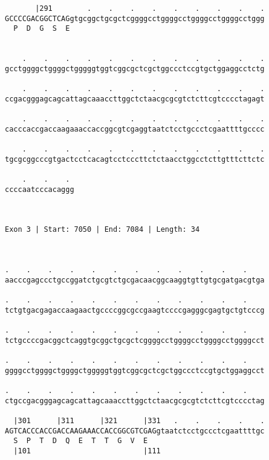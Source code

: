 \documentclass{article}
\begin{document}
\begin{Verbatim}
       |291        .    .    .    .    .    .    .    .    .
GCCCCGACGGCTCAGgtgcggctgcgctcggggcctggggcctggggcctggggcctggg
  P  D  G  S  E                                             
                                                            
  
    .    .    .    .    .    .    .    .    .    .    .    .
gcctggggctggggctgggggtggtcggcgctcgctggccctccgtgctggaggcctctg
                                                            
    .    .    .    .    .    .    .    .    .    .    .    .
ccgacgggagcagcattagcaaaccttggctctaacgcgcgtctcttcgtcccctagagt
                                                            
    .    .    .    .    .    .    .    .    .    .    .    .
cacccaccgaccaagaaaccaccggcgtcgaggtaatctcctgccctcgaattttgcccc
                                                            
    .    .    .    .    .    .    .    .    .    .    .    .
tgcgcggcccgtgactcctcacagtcctcccttctctaacctggcctcttgtttcttctc
                                                            
    .    .    . 
ccccaatcccacaggg
                
                
 
Exon 3 | Start: 7050 | End: 7084 | Length: 34



.    .    .    .    .    .    .    .    .    .    .    .    
aacccgagccctgccggatctgcgtctgcgacaacggcaaggtgttgtgcgatgacgtga
                                                            
.    .    .    .    .    .    .    .    .    .    .    .    
tctgtgacgagaccaagaactgccccggcgccgaagtccccgagggcgagtgctgtcccg
                                                            
.    .    .    .    .    .    .    .    .    .    .    .    
tctgccccgacggctcaggtgcggctgcgctcggggcctggggcctggggcctggggcct
                                                            
.    .    .    .    .    .    .    .    .    .    .    .    
ggggcctggggctggggctgggggtggtcggcgctcgctggccctccgtgctggaggcct
                                                            
.    .    .    .    .    .    .    .    .    .    .    .    
ctgccgacgggagcagcattagcaaaccttggctctaacgcgcgtctcttcgtcccctag
                                                            
  |301      |311      |321      |331   .    .    .    .    .
AGTCACCCACCGACCAAGAAACCACCGGCGTCGAGgtaatctcctgccctcgaattttgc
  S  P  T  D  Q  E  T  T  G  V  E                           
  |101                          |111                        
  

\end{Verbatim}
\end{document}
